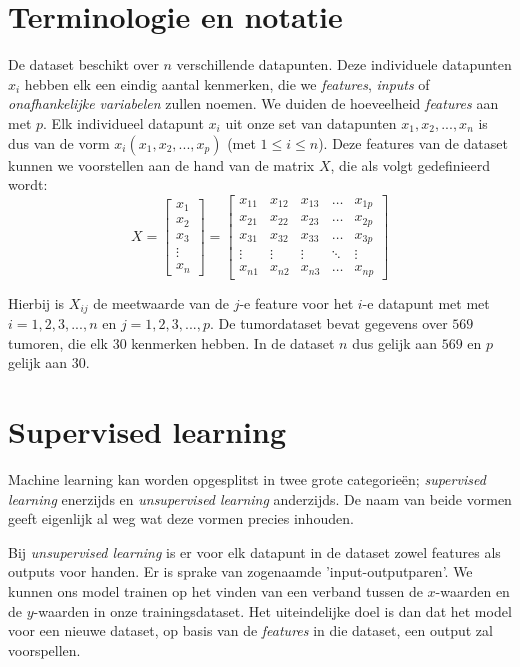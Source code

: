\documentclass[twoside, kulak]{kulakreport}
\begin{document}
	\section{Terminologie en notatie}
	
	De dataset beschikt over \(n\) verschillende datapunten. Deze individuele datapunten \(x_i\) hebben elk een eindig aantal kenmerken, die we \textit{features}, \textit{inputs} of \textit{onafhankelijke variabelen} zullen noemen. We duiden de hoeveelheid \textit{features} aan met \(p\). Elk individueel datapunt \(x_i\) uit onze set van datapunten \(x_1,x_2,...,x_n\) is dus van de vorm \(x_i(x_1,x_2,...,x_p)\) (met \( 1 \leq i \leq n \)). Deze features van de dataset kunnen we voorstellen aan de hand van de matrix \(X\), die als volgt gedefinieerd wordt: \[X = \left[ 
	\begin{array}{c}
		x_1 \\
		x_2 \\
		x_3 \\
		\vdots \\
		x_n
	\end{array} \right] = \left[ 
	\begin{array}{ccccc}
		x_{11} & x_{12} & x_{13} & \ldots & x_{1p}  \\
		x_{21} & x_{22} & x_{23} & \ldots & x_{2p} \\
		x_{31} & x_{32} & x_{33} & \ldots & x_{3p} \\
		\vdots & \vdots & \vdots & \ddots & \vdots \\
		x_{n1} & x_{n2} & x_{n3} & \ldots & x_{np}
	\end{array}\right]\]
	
	Hierbij is \(X_{ij}\) de meetwaarde van de \(j\)-e feature voor het \(i\)-e datapunt met met \(i=1,2,3,...,n\) en \(j=1,2,3,...,p\). De tumordataset bevat gegevens over \(569\) tumoren, die elk \(30\) kenmerken hebben. In de dataset \(n\) dus gelijk aan \(569\) en \(p\) gelijk aan \(30\).
	
	\section{Supervised learning}
	
	Machine learning kan worden opgesplitst in twee grote categorieën; \textit{supervised learning} enerzijds en \textit{unsupervised learning} anderzijds. De naam van beide vormen geeft eigenlijk al weg wat deze vormen precies inhouden.
	
	Bij \textit{unsupervised learning} is er voor elk datapunt in de dataset zowel features als outputs voor handen. Er is sprake van zogenaamde 'input-outputparen'. We kunnen ons model trainen op het vinden van een verband tussen de \(x\)-waarden en de \(y\)-waarden in onze trainingsdataset. Het uiteindelijke doel is dan dat het model voor een nieuwe dataset, op basis van de \textit{features} in die dataset, een output zal voorspellen.
	
\end{document}
